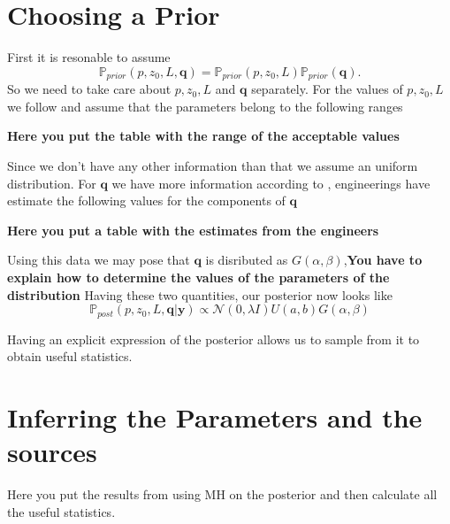\documentclass[12pt]{book}
\newcommand{\post}{\mathbb{P}_{post}}
\newcommand{\prior}{\mathbb{P}_{prior}}
\newcommand{\q}{\textbf{q}}
\newcommand{\pars}{p,z_{0},L}
\newcommand{\y}{\textbf{y}}
\begin{document}
\section{Choosing a Prior}
First it is resonable to assume
\begin{equation*} 
\prior(\pars,\q)=\prior(\pars)\prior(\q).
\end{equation*}
So we need to take care about $\pars$ and $\q$ separately. For the values of $\pars$ we follow \cite{hosseini2016airborne}
and assume that the parameters belong to the following ranges
\begin{center}
\textbf{Here you put the table with the range of the acceptable values}
\end{center}
Since we don't have any other information than that we assume an uniform distribution.
For $\q$ we have more information according to \cite{hosseini2016airborne}, engineerings have estimate
the following values for the components of $\q$
\begin{center}
\textbf{Here you put a table with the estimates from the engineers}
\end{center}
Using this data we may pose that $\q$ is disributed as $G(\alpha,\beta)$,\textbf{You have to explain
how to determine the values of the parameters of the distribution}
Having these two quantities, our posterior now looks like
\begin{equation*}
\post(\pars,\q|\y)\propto\mathcal{N}(0,\lambda I)U(a,b)G(\alpha,\beta)
\end{equation*}

Having an explicit expression of the posterior allows us to sample from it to 
obtain useful statistics.

\section{Inferring the Parameters and the sources}
Here you put the results from using MH on the posterior
and then calculate all the useful statistics.







\end{document}
